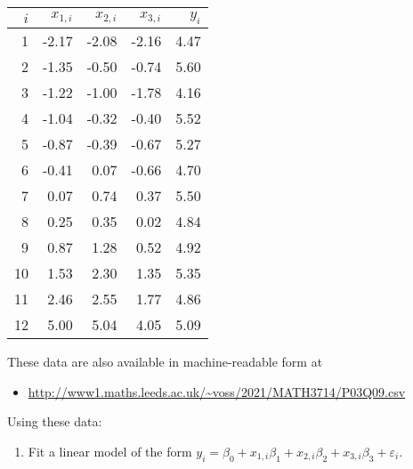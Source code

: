 \documentclass[
  a4paper,
]{article}
\providecommand{\tightlist}{%
  \setlength{\itemsep}{0pt}\setlength{\parskip}{0pt}}
\theoremstyle{definition}
\theoremstyle{definition}
\theoremstyle{definition}
\theoremstyle{definition}
\theoremstyle{remark}
\begin{document}
\begin{longtable}[]{@{}rrrrr@{}}
\toprule
\(i\) & \(x_{1,i}\) & \(x_{2,i}\) & \(x_{3,i}\) & \(y_i\) \\
\midrule
\endhead
1 & -2.17 & -2.08 & -2.16 & 4.47 \\
2 & -1.35 & -0.50 & -0.74 & 5.60 \\
3 & -1.22 & -1.00 & -1.78 & 4.16 \\
4 & -1.04 & -0.32 & -0.40 & 5.52 \\
5 & -0.87 & -0.39 & -0.67 & 5.27 \\
6 & -0.41 & 0.07 & -0.66 & 4.70 \\
7 & 0.07 & 0.74 & 0.37 & 5.50 \\
8 & 0.25 & 0.35 & 0.02 & 4.84 \\
9 & 0.87 & 1.28 & 0.52 & 4.92 \\
10 & 1.53 & 2.30 & 1.35 & 5.35 \\
11 & 2.46 & 2.55 & 1.77 & 4.86 \\
12 & 5.00 & 5.04 & 4.05 & 5.09 \\
\bottomrule
\end{longtable}

These data are also available in machine-readable form at

\begin{itemize}
\tightlist
\item
  \url{http://www1.maths.leeds.ac.uk/~voss/2021/MATH3714/P03Q09.csv}
\end{itemize}

Using these data:

\begin{enumerate}
\def\labelenumi{\alph{enumi}.}
\tightlist
\item
  Fit a linear model of the form
  \(y_i = \beta_0 + x_{1,i} \beta_1 + x_{2,i} \beta_2 + x_{3,i} \beta_3 + \varepsilon_i\).
\end{enumerate}
\end{document}
